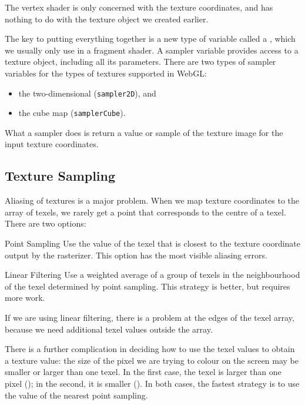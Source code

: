 \documentclass[../COS3712_Notes.tex]{subfiles}
\begin{document}
        The vertex shader is only concerned with the texture coordinates,
        and has nothing to do with the texture object we created earlier.

        The key to putting everything together is a new type of variable called a ,
        which we usually only use in a fragment shader.
        A sampler variable provides access to a texture object, including all its parameters.
        There are two types of sampler variables for the types of textures supported in WebGL:
        \begin{itemize}
          \item the two-dimensional (\texttt{sampler2D}), and
          \item the cube map (\texttt{samplerCube}).
        \end{itemize}
        What a sampler does is return a value or sample of the texture image
        for the input texture coordinates.

      \subsection{Texture Sampling}
        Aliasing of textures is a major problem.
        When we map texture coordinates to the array of texels, we rarely get a point
        that corresponds to the centre of a texel.
        There are two options:
        \begin{descriptimize}
          \item[Point Sampling] Use the value of the texel that is closest to the texture
            coordinate output by the rasterizer.
            This option has the most visible aliasing errors.
          \item[Linear Filtering] Use a weighted average of a group of texels in the neighbourhood
            of the texel determined by point sampling.
            This strategy is better, but requires more work.
        \end{descriptimize}
        If we are using linear filtering, there is a problem at the edges of the texel array,
        because we need additional texel values outside the array.

        There is a further complication in deciding how to use the texel values to obtain
        a texture value: the size of the pixel we are trying to colour on the screen
        may be smaller or larger than one texel.
        In the first case, the texel is larger than one pixel ();
        in the second, it is smaller ().
        In both cases, the fastest strategy is to use the value of the nearest point sampling.
\end{document}
